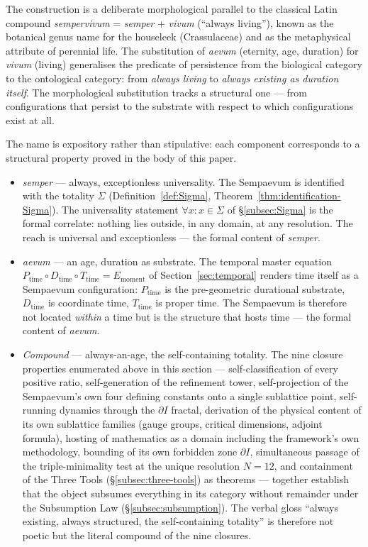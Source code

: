\documentclass[11pt,a4paper]{article}
\theoremstyle{definition}
\theoremstyle{remark}
\begin{document}
The construction is a deliberate morphological parallel to the classical Latin compound \emph{sempervivum} = \emph{semper} + \emph{vivum} (``always living''), known as the botanical genus name for the houseleek (Crassulaceae) and as the metaphysical attribute of perennial life. The substitution of \emph{aevum} (eternity, age, duration) for \emph{vivum} (living) generalises the predicate of persistence from the biological category to the ontological category: from \emph{always living} to \emph{always existing as duration itself}. The morphological substitution tracks a structural one --- from configurations that persist to the substrate with respect to which configurations exist at all.

The name is expository rather than stipulative: each component corresponds to a structural property proved in the body of this paper.

\begin{itemize}[leftmargin=*]
\item \emph{semper} --- always, exceptionless universality. The Sempaevum is identified with the totality $\Sigma$ (Definition~\ref{def:Sigma}, Theorem~\ref{thm:identification-Sigma}). The universality statement $\forall x : x \in \Sigma$ of \S\ref{subsec:Sigma} is the formal correlate: nothing lies outside, in any domain, at any resolution. The reach is universal and exceptionless --- the formal content of \emph{semper}.

\item \emph{aevum} --- an age, duration as substrate. The temporal master equation $P_{\text{time}} \circ D_{\text{time}} \circ T_{\text{time}} = E_{\text{moment}}$ of Section~\ref{sec:temporal} renders time itself as a Sempaevum configuration: $P_{\text{time}}$ is the pre-geometric durational substrate, $D_{\text{time}}$ is coordinate time, $T_{\text{time}}$ is proper time. The Sempaevum is therefore not located \emph{within} a time but is the structure that hosts time --- the formal content of \emph{aevum}.

\item \emph{Compound} --- always-an-age, the self-containing totality. The nine closure properties enumerated above in this section --- self-classification of every positive ratio, self-generation of the refinement tower, self-projection of the Sempaevum's own four defining constants onto a single sublattice point, self-running dynamics through the $\partial I$ fractal, derivation of the physical content of its own sublattice families (gauge groups, critical dimensions, adjoint formula), hosting of mathematics as a domain including the framework's own methodology, bounding of its own forbidden zone $\partial I$, simultaneous passage of the triple-minimality test at the unique resolution $N=12$, and containment of the Three Tools (\S\ref{subsec:three-tools}) as theorems --- together establish that the object subsumes everything in its category without remainder under the Subsumption Law (\S\ref{subsec:subsumption}). The verbal gloss ``always existing, always structured, the self-containing totality'' is therefore not poetic but the literal compound of the nine closures.
\end{itemize}
\end{document}
